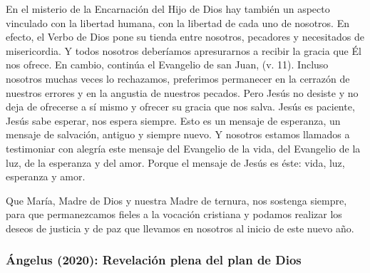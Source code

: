 \begin{body}
	En el misterio de la Encarnación del Hijo de Dios hay también un aspecto vinculado con la libertad humana, con la libertad de cada uno de nosotros. En efecto, el Verbo de Dios pone su tienda entre nosotros, pecadores y necesitados de misericordia. Y todos nosotros deberíamos apresurarnos a recibir la gracia que Él nos ofrece. En cambio, continúa el Evangelio de san Juan,  (v. 11). Incluso nosotros muchas veces lo rechazamos, preferimos permanecer en la cerrazón de nuestros errores y en la angustia de nuestros pecados. Pero Jesús no desiste y no deja de ofrecerse a sí mismo y ofrecer su gracia que nos salva. Jesús es paciente, Jesús sabe esperar, nos espera siempre. Esto es un mensaje de esperanza, un mensaje de salvación, antiguo y siempre nuevo. Y nosotros estamos llamados a testimoniar con alegría este mensaje del Evangelio de la vida, del Evangelio de la luz, de la esperanza y del amor. Porque el mensaje de Jesús es éste: vida, luz, esperanza y amor.
	
	Que María, Madre de Dios y nuestra Madre de ternura, nos sostenga siempre, para que permanezcamos fieles a la vocación cristiana y podamos realizar los deseos de justicia y de paz que llevamos en nosotros al inicio de este nuevo año.
\end{body}

\subsubsection{Ángelus (2020): Revelación plena del plan de Dios}



